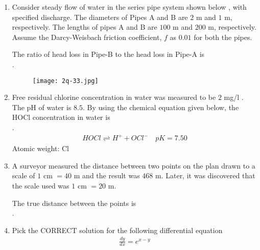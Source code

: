 \documentclass[journal,12pt,onecolumn]{article}
\theoremstyle{remark}
\begin{document}
\begin{enumerate}
    \hfill{}

    \item Consider steady flow of water in the series pipe system shown below , with specified discharge. The diameters of Pipes A and B are $2$ m and $1$ m, respectively. The lengths of pipes A and B are $100$ m and $200$ m, respectively. Assume the Darcy-Weisbach friction coefficient, $f$ as $0.01$ for both the pipes.
    
    The ratio of head loss in Pipe-B to the head loss in Pipe-A is \underline{\hspace{2cm}} \\ .
    \begin{figure}[H]
        \centering
        \texttt{[image: 2q-33.jpg]}
        \caption{}
        \label{fig:q33}
    \end{figure}
    
    \hfill{}

    \item Free residual chlorine concentration in water was measured to be $2$ mg/l . The pH of water is $8.5$. By using the chemical equation given below, the HOCl concentration  in water is \underline{\hspace{2cm}}\\ .
    \begin{align}
    HOCl \rightleftharpoons H^+ + OCl^- \quad pK = 7.50 
    \end{align}
    Atomic weight: Cl
   
    \hfill{}

    \item A surveyor measured the distance between two points on the plan drawn to a scale of $1$ cm $= 40$ m and the result was $468$ m. Later, it was discovered that the scale used was $1$ cm $= 20$ m.
    
    The true distance between the points  is \underline{\hspace{2cm}} \\ .
    
    \hfill{}
    
    \item Pick the CORRECT solution for the following differential equation
    \begin{align}
    \frac{dy}{dx} = e^{x-y} 
    \end{align}


\end{enumerate}
\end{document}
